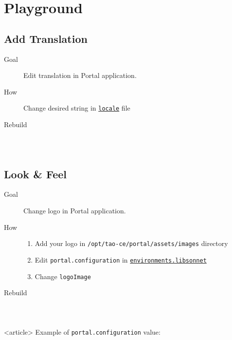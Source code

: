\section{Playground}
\subsection{Add Translation}
\begin{frame}[fragile=singleslide]
    \begin{description}
    \item[Goal] Edit translation in \alert{Portal} application.
    \item[How]  Change desired string in \href{https://github.com/tao-ce/tao-portal/blob/3bd33d6c6ded174f26410a3d4c60c73adbda8a62/frontend/src/locale/en-US/messages.po#L1215-L1217}{\texttt{locale}} file
    \item[Rebuild] \, \inputminted{bash}{./snippets/apps-portal-up.sh}
    \end{description}
\end{frame}
\subsection{Look \& Feel}
\begin{frame}[fragile=singleslide]
    \begin{description}
    \item[Goal] Change logo in \alert{Portal} application.
    \item[How] \begin{enumerate}
        \item Add your logo in \texttt{/opt/tao-ce/portal/assets/images} directory
        \item Edit \texttt{portal.configuration} in \href{https://github.com/tao-ce/tao-ce/blob/837b29614f205a40918327fa478b5c0170e5b6d1/libexec/setup/apps/files/environments.libsonnet#L19-L21}{\texttt{environments.libsonnet}}
        \item Change \texttt{logoImage}
    \end{enumerate}
    \item[Rebuild] \, \inputminted{bash}{./snippets/dev-setup.sh}
    \end{description}

\begin{onlyenv}<article>
Example of \texttt{portal.configuration} value:
\inputminted[fontsize=\scriptsize]{jsonnet}{./snippets/portal-config.jsonnet}
\end{onlyenv}
\end{frame}
